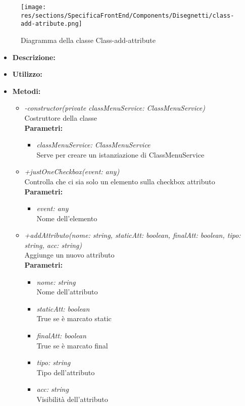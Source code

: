\begin{figure}[h!]
	\centering
	\texttt{[image: res/sections/SpecificaFrontEnd/Components/Disegnetti/class-add-atribute.png]}
	\caption{Diagramma della classe Class-add-attribute}
\end{figure}

\begin{itemize}
	\item \textbf{Descrizione:}\\
	
	\item \textbf{Utilizzo:}\\
	
	\item \textbf{Metodi:}
		\begin{itemize}
			\item \emph{-constructor(private classMenuService: ClassMenuService)}\\
    		Costruttore della classe\\
    		\textbf{Parametri:}
    		\begin{itemize}
    			\item \emph{classMenuService: ClassMenuService}\\
    			Serve per creare un istanziazione di ClassMenuService
    		\end{itemize}
    		\item \emph{+justOneCheckbox(event: any)}\\
    		Controlla che ci sia solo un elemento sulla checkbox attributo\\
    		\textbf{Parametri:}
    		\begin{itemize}
    			\item \emph{event: any}\\
    			Nome dell'elemento
    		\end{itemize}
    		\item \emph{+addAttributo(nome: string, staticAtt: boolean, finalAtt: boolean, tipo: string, acc: string) }\\
    		Aggiunge un nuovo attributo\\
    		\textbf{Parametri:}
    		\begin{itemize}
    			\item \emph{nome: string}\\
    			Nome dell'attributo
    			\item \emph{staticAtt: boolean}\\
    			True se è marcato static
    			\item \emph{finalAtt: boolean}\\
    			True se è marcato final
    			\item \emph{tipo: string}\\
    			Tipo dell'attributo
    			\item \emph{acc: string}\\
    			Visibilità dell'attributo
    		\end{itemize}
		\end{itemize}
\end{itemize}